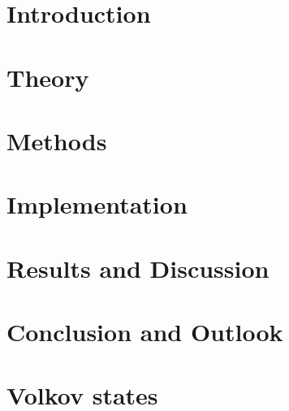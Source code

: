 \documentclass[12pt, twoside]{report}
\begin{document}

\cleardoublepage

\cleardoublepage


\setcounter{page}{1}


\begin{abstract}
    
\end{abstract}


\tableofcontents
\cleardoublepage


\listoffigures
\cleardoublepage


\setcounter{page}{1}


\chapter{Introduction}

\cleardoublepage


\chapter{Theory}

\cleardoublepage


\chapter{Methods}

\cleardoublepage


\chapter{Implementation}

\cleardoublepage


\chapter{Results and Discussion}

\cleardoublepage


\chapter{Conclusion and Outlook}

\cleardoublepage


\appendix
\chapter{Volkov states}

\cleardoublepage
\end{document}
